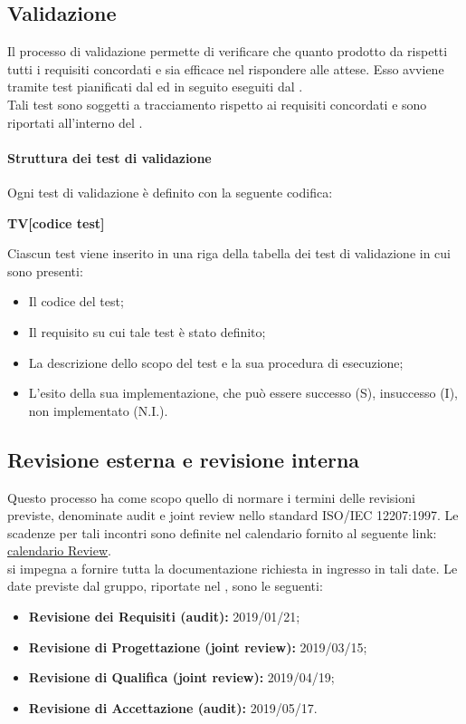 \subsection{Validazione} \label{subsection:validazione}
Il processo di validazione permette di verificare che quanto prodotto da \groupName{} rispetti tutti i requisiti concordati e sia efficace nel rispondere alle attese. Esso avviene tramite test pianificati dal \roleDesigner{} ed in seguito eseguiti dal \roleVerifier{}.\\ Tali test sono soggetti a tracciamento rispetto ai requisiti concordati e sono riportati all'interno del \docNameVersionPdQ{}.
\paragraph{Struttura dei test di validazione}
Ogni test di validazione è definito con la seguente codifica:
\begin{center}
	\textbf{TV[codice test]}
\end{center}
Ciascun test viene inserito in una riga della tabella dei test di validazione in cui sono presenti:
\begin{itemize}
	\item  Il codice del test;
	\item  Il requisito su cui tale test è stato definito;
	\item  La descrizione dello scopo del test e la sua procedura di esecuzione;
	\item  L’esito della sua implementazione, che può essere successo (S), insuccesso (I), non implementato (N.I.).
\end{itemize}

\subsection{Revisione esterna e revisione interna}\label{Section:revisioni}
Questo processo ha come scopo quello di normare i termini delle revisioni previste, denominate audit e joint review nello standard ISO/IEC 12207:1997. Le scadenze per tali incontri sono definite nel calendario fornito al seguente link: \href{https://www.math.unipd.it/~tullio/IS-1/2018/Dispense/P01.pdf}{calendario Review}.\\ 
\groupName{} si impegna a fornire tutta la documentazione richiesta in ingresso in tali date. Le date previste dal gruppo, riportate nel \docNameVersionPdP{}, sono le seguenti:
\begin{itemize}
	\item \textbf{Revisione dei Requisiti (audit): }2019/01/21;
	\item \textbf{Revisione di Progettazione (joint review): }2019/03/15;
	\item \textbf{Revisione di Qualifica (joint review): }2019/04/19;
	\item \textbf{Revisione di Accettazione (audit): }2019/05/17.
\end{itemize}


